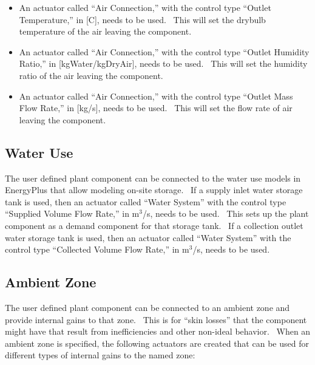 \begin{itemize}
\item
  An actuator called ``Air Connection,'' with the control type ``Outlet Temperature,'' in {[}C{]}, needs to be used.~ This will set the drybulb temperature of the air leaving the component.
\item
  An actuator called ``Air Connection,'' with the control type ``Outlet Humidity Ratio,'' in {[}kgWater/kgDryAir{]}, needs to be used.~ This will set the humidity ratio of the air leaving the component.
\item
  An actuator called ``Air Connection,'' with the control type ``Outlet Mass Flow Rate,'' in {[}kg/s{]}, needs to be used.~ This will set the flow rate of air leaving the component.
\end{itemize}

\subsection{Water Use}\label{water-use-001}

The user defined plant component can be connected to the water use models in EnergyPlus that allow modeling on-site storage.~ If a supply inlet water storage tank is used, then an actuator called ``Water System'' with the control type ``Supplied Volume Flow Rate,'' in m\(^{3}\)/s, needs to be used.~ This sets up the plant component as a demand component for that storage tank.~ If a collection outlet water storage tank is used, then an actuator called ``Water System'' with the control type ``Collected Volume Flow Rate,'' in m\(^{3}\)/s, needs to be used.

\subsection{Ambient Zone}\label{ambient-zone-001}

The user defined plant component can be connected to an ambient zone and provide internal gains to that zone.~ This is for ``skin losses'' that the component might have that result from inefficiencies and other non-ideal behavior.~ When an ambient zone is specified, the following actuators are created that can be used for different types of internal gains to the named zone:

